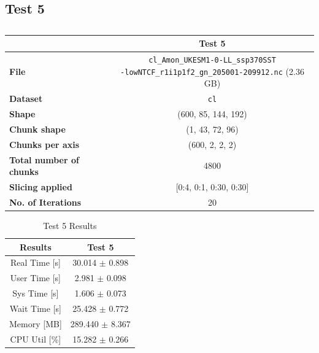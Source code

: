 \documentclass{article}
\begin{document}
\subsection{Test 5}
\begin{table}[h!] 
    \centering 
    \begin{tabular}{lc}  \hline
                                        & Test 5                                                                                                        \\ \hline
        \textbf{File}                   &  \makecell{\texttt{cl\_Amon\_UKESM1-0-LL\_ssp370SST}\\ \texttt{-lowNTCF\_r1i1p1f2\_gn\_205001-209912.nc} (2.36 GB)}     \\  
        \textbf{Dataset}                &\texttt{cl}                                                                                \\ 
        \textbf{Shape}                  &  (600, 85, 144, 192)                                                                                              \\ 
        \textbf{Chunk shape}            & (1, 43, 72, 96)                                                                                                 \\ 
        \textbf{Chunks per axis}        & (600, 2, 2, 2)                                                                                                  \\ 
        \textbf{Total number of chunks} & 4800                                                                                                          \\ 
        \textbf{Slicing applied}        & [0:4, 0:1, 0:30, 0:30]                                                                                             \\ 
        \textbf{No. of Iterations}      & 20                                                                                                            \\  \hline
    \end{tabular} 
    \caption{} 
    \label{tab:T5_Conditions} 
\end{table}


\begin{table}[h!]
    \centering
    \begin{tabular}{cc}
        \hline
        \textbf{Results} & Test 5              \\ \hline
        Real Time [s]    & 30.014 $\pm$ 0.898  \\
        User Time [s]    & 2.981 $\pm$ 0.098   \\
        Sys Time [s]     & 1.606 $\pm$ 0.073   \\
        Wait Time [s]    & 25.428 $\pm$ 0.772  \\
        Memory [MB]      & 289.440 $\pm$ 8.367 \\
        CPU Util [\%]    & 15.282 $\pm$ 0.266  \\
        \hline
    \end{tabular}
    \caption{Test 5 Results}
    \label{tab:T5_Results}
\end{table}
\end{document}
